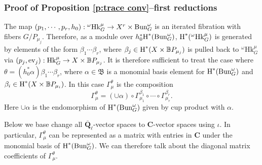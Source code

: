 \documentclass[reqno]{amsart}
\numberwithin{equation}{subsection}
\theoremstyle{definition}
\def\BB{\mathbb{B}}
\def\CC{\mathbf{C}}
\newcommand\frB{\mathfrak{B}}
\newcommand{\Bun}{\textup{Bun}}
\newcommand\ev{\textup{ev}}
\newcommand\Hk{\mathrm{Hk}}
\newcommand{\Qlbar}{\overline{\Q}_\ell}
\newcommand{\wt}[1]{\widetilde{#1}}
\renewcommand\c\circ
\newcommand{\cohog}[2]{\textup{H}^{#1}({#2})}     %
\renewcommand\a\alpha
\renewcommand\b\beta
\newcommand\G\Gamma
\newcommand{\io}{\iota}
\renewcommand{\th}{\theta}
\renewcommand\r\rho
\newcommand{\om}{\omega}
\newcommand{\Q}{\mathbf{Q}}
\begin{document}
\subsubsection{Proof of Proposition \ref{p:trace conv}--first reductions}
The map $(p_1,\cdots, p_r, h_0): {}^\om\Hk^\mu_G\to X^r\times \Bun_G^\om$ is an iterated fibration with fibers $G/P_{\mu_j}$.  Therefore, as a module over $h_0^*\cohog{*}{\Bun_G^\om}$, $\cohog{*}{{}^\om\Hk^\mu_G}$ is generated by elements of the form $\b_1\cdots\b_r$, where $\b_j\in \cohog{*}{X\times \BB P_{\mu_j}}$ is pulled back to ${}^\om\Hk^\mu_G$ via $(p_j,\ev_j): \Hk^\mu_G\to X\times \BB P_{\mu_j}$.
It is therefore sufficient to treat the case where $\th=(h_0^*\a)\b_1\cdots\b_r$, where $\a\in \frB$ is a monomial basis element for $\cohog{*}{\Bun_G^\om}$ and $\b_i\in \cohog{*}{X\times \BB P_{\mu_i}}$. In this case $\G^\th_\mu$ is the composition
\begin{equation*}
        \G^\th_\mu=(\cup \a)\c \G^{\b_1}_{\mu_1}\c\cdots\c \G^{\b_r}_{\mu_r}.
\end{equation*}
Here $\cup\a$ is the endomorphism of $\cohog{*}{\Bun_G^\om}$ given by cup product with $\a$.

Below we base change all $\Qlbar$-vector spaces to $\CC$-vector spaces using $\io$. In particular, $\G^\th_\mu$ can be represented as a matrix with entries in $\CC$ under the monomial basis of $\cohog{*}{\Bun_G^\om}$. We can therefore talk about the diagonal matrix coefficients of $\G^\th_\mu$. 
\end{document}
